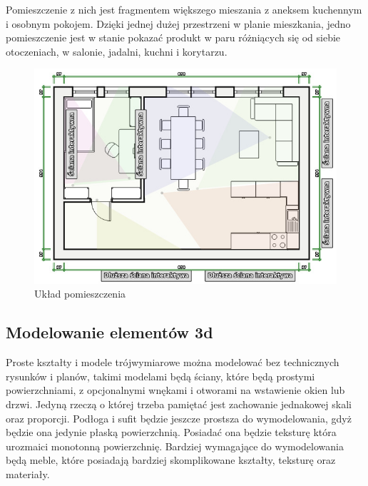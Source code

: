 \documentclass{article} %
\begin{document}
        Pomieszczenie z nich jest fragmentem większego mieszania z aneksem kuchennym i osobnym pokojem. Dzięki jednej dużej przestrzeni w planie mieszkania, jedno pomieszczenie jest w stanie pokazać produkt w paru różniących się od siebie otoczeniach, w salonie, jadalni, kuchni i korytarzu. 
        \\

        \begin{figure}[h]
        \centering
        \includegraphics[bb=0 0 640 455,scale=0.5,keepaspectratio=true]{images/diagrams/big_salon.jpeg}
        \caption{Układ pomieszczenia}
        \end{figure}
        
    \subsection{Modelowanie elementów 3d}
        Proste kształty i modele trójwymiarowe można modelować bez technicznych rysunków i planów, takimi modelami będą ściany, które będą prostymi powierzchniami, z opcjonalnymi wnękami i otworami na wstawienie okien lub drzwi. Jedyną rzeczą o której trzeba pamiętać jest zachowanie jednakowej skali oraz proporcji. Podłoga i sufit będzie jeszcze prostsza do wymodelowania, gdyż będzie ona jedynie płaską powierzchnią. Posiadać ona będzie teksturę która urozmaici monotonną powierzchnię.    Bardziej wymagające do wymodelowania będą meble, które posiadają bardziej skomplikowane kształty, teksturę oraz materiały. 
        \\
\end{document}
